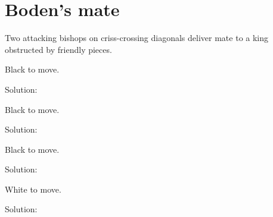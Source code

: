 \documentclass{book}
\begin{document}
\section{Boden's mate}
Two attacking bishops on criss-crossing diagonals deliver mate to a king obstructed by friendly pieces.\begin{multicols}{2} 
\begin{samepage} 
\newgame 


 
\showboard
 
 Black to move. 
 
Solution: 
 
\end{samepage}\begin{samepage} 
\newgame 


 
\showboard
 
 Black to move. 
 
Solution: 
 
\end{samepage}\begin{samepage} 
\newgame 


 
\showboard
 
 Black to move. 
 
Solution: 
 
\end{samepage}\begin{samepage} 
\newgame 


 
\showboard
 
 White to move. 
 
Solution: 
 
\end{samepage}\end{multicols} 
\newpage 
\end{document}
